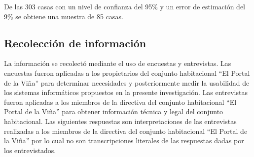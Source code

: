 De las 303 casas con un nivel de confianza del 95\% y un error de estimación del 9\% se obtiene una muestra de 85 casas.

\subsection{Recolección de información}

La información se recolectó mediante el uso de encuestas y entrevistas. Las encuestas fueron aplicadas a los propietarios del conjunto habitacional {\textquotedblleft}El Portal de la Viña{\textquotedblright} para determinar necesidades y posteriormente medir la usabilidad de los sistemas informáticos propuestos en la presente investigación. Las entrevistas fueron aplicadas a los miembros de la directiva del conjunto habitacional {\textquotedblleft}El Portal de la Viña{\textquotedblright} para obtener información técnica y legal del conjunto habitacional.
\bigbreak
Las siguientes respuestas son interpretaciones de las entrevistas realizadas a los miembros de la directiva del conjunto habitacional {\textquotedblleft}El Portal de la Viña{\textquotedblright} por lo cual no son transcripciones literales de las respuestas dadas por los entrevistados.

